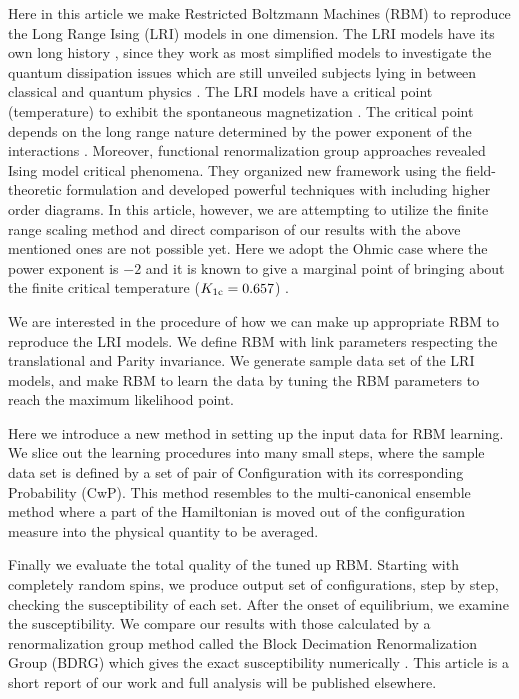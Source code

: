 \documentclass[a4paper,preprint,superscriptaddress,preprintnumbers,nofootinbib]{revtex4}
\begin{document}
Here in this article we make Restricted Boltzmann Machines (RBM) 
\cite{Smo86,Hinton02} to reproduce
the Long Range Ising (LRI) models in one dimension. 
The LRI models have its own 
long history \cite{LRI-old}, since they work as most simplified models to investigate
the quantum dissipation issues which are still unveiled subjects lying in between
classical and quantum physics 
\cite{Caldeira-Leggett,suzuki92,MC-qm,Instanton-qm, nprg-qm} . 
The LRI models have a critical 
point (temperature) to exhibit the spontaneous magnetization \cite{math-qm,KT} . 
The critical
point depends on the long range nature determined by the power exponent
of the interactions \cite{MC-Ising} .
Moreover, functional renormalization group approaches revealed
Ising model critical phenomena\cite{Wetterich,Delamotte}.
They organized new framework using the field-theoretic 
formulation and developed powerful techniques with 
including higher order diagrams. In this article, however, 
we are attempting to utilize the finite range scaling method
and direct comparison of our results with the above
mentioned ones are not possible yet.
Here we adopt the Ohmic case where the power exponent 
is $-2$ and it is known to give a marginal point of bringing about 
the finite critical temperature ($K_{1\rm c}=0.657$) \cite{Ising-FRS08} .

We are interested in the procedure of how we can make up appropriate
RBM to reproduce the LRI models.
We define RBM with link parameters respecting the translational
and Parity invariance.
We generate sample data set of the LRI models, and make 
RBM to learn the data by tuning the RBM parameters to reach the
maximum likelihood point.

Here we introduce a new method in setting up the input data for
RBM learning.
We slice out the learning procedures into many small steps, where
the sample data set is defined by a set of pair of Configuration
with its corresponding Probability (CwP).
This method resembles to the multi-canonical ensemble method
where a part of the Hamiltonian is moved out of the configuration
measure into the physical quantity to be averaged.

Finally we evaluate the total quality of the tuned up RBM.
Starting with completely random spins, 
we produce output set of configurations, 
step by step, checking the susceptibility of each set.
After the onset of equilibrium, we examine the susceptibility. 
We compare our results with those calculated
by a renormalization group method
called the Block Decimation Renormalization Group (BDRG) which gives
the exact susceptibility numerically \cite{Ising-FRS08,QM-FRS12}.
This article is a short report of our work and full analysis will be
published elsewhere.
 
\end{document}
